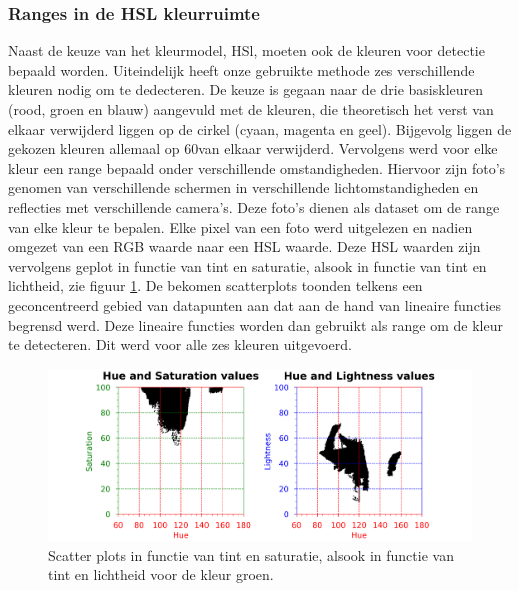 \subsubsection{Ranges in de HSL kleurruimte} \label{Ranges}
Naast de keuze van het kleurmodel, HSl, moeten ook de kleuren voor detectie bepaald worden. Uiteindelijk heeft onze gebruikte methode zes verschillende kleuren nodig om te dedecteren. De keuze is gegaan naar de drie basiskleuren (rood, groen en blauw) aangevuld met de kleuren, die theoretisch het verst van elkaar verwijderd liggen op de cirkel (cyaan, magenta en geel). Bijgevolg liggen de gekozen kleuren allemaal op 60\degree van elkaar verwijderd. Vervolgens werd voor elke kleur een range bepaald onder verschillende omstandigheden. Hiervoor zijn foto's genomen van verschillende schermen in verschillende lichtomstandigheden en reflecties met verschillende camera's. Deze foto's dienen als dataset om de range van elke kleur te bepalen. Elke pixel van een foto werd uitgelezen en nadien omgezet van een RGB waarde naar een HSL waarde. Deze HSL waarden zijn vervolgens geplot in functie van tint en saturatie, alsook in functie van tint en lichtheid, zie figuur \ref{hslGreenPlot}. De bekomen scatterplots toonden telkens een geconcentreerd gebied van datapunten aan dat aan de hand van lineaire functies begrensd werd. Deze lineaire functies worden dan gebruikt als range om de kleur te detecteren. Dit werd voor alle zes kleuren uitgevoerd. \cite{TSAI20121291}

\begin{figure}[h!]
	\center
	\includegraphics[width=\textwidth]{img/hslGreen.png}
	\caption{Scatter plots in functie van tint en saturatie, alsook in functie van tint en lichtheid voor de kleur groen.}
	\label{hslGreenPlot}
\end{figure}

